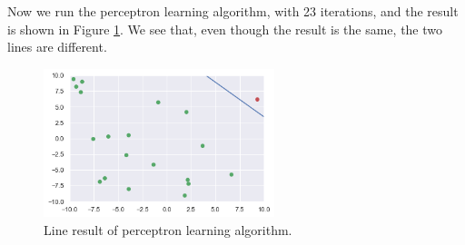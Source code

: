 \documentclass{article}
\begin{document}
    Now we run the perceptron learning algorithm, with 23 iterations, and the result is shown in Figure \ref{fig:pla}.
    We see that, even though the result is the same, the two lines are different.
    
    \begin{figure}[H]
        \centering
        \includegraphics[width=0.6\textwidth]{exercise_1.4_3.png}
        \caption{Line result of perceptron learning algorithm.}
        \label{fig:pla}
    \end{figure}

    \nocite{yaser2012learning}
    
    
\end{document}
